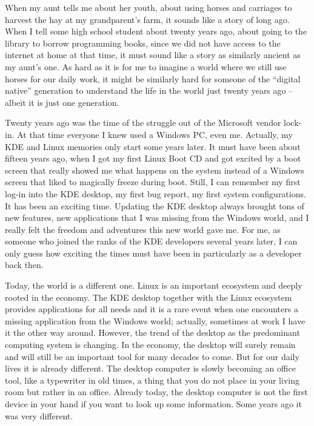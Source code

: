 
\noindent{}When my aunt tells me about her youth, about using horses and carriages to harvest the hay at my grandparent's farm, it sounds like a story of long ago. When I tell some high school student about twenty years ago, about going to the library to borrow programming books, since we did not have access to the internet at home at that time, it must sound like a story as similarly ancient as my aunt’s one. As hard as it is for me to imagine a world where we still use horses for our daily work, it might be similarly hard for someone of the ``digital native'' generation to understand the life in the world just twenty years ago – albeit it is just one generation.

Twenty years ago was the time of the struggle out of the Microsoft vendor lock-in. At that time everyone I knew used a Windows PC, even me. Actually, my KDE and Linux memories only start some years later. It must have been about fifteen years ago, when I got my first Linux Boot CD and got excited by a boot screen that really showed me what happens on the system instead of a Windows screen that liked to magically freeze during boot. Still, I can remember my first log-in into the KDE desktop, my first bug report, my first system configurations. It has been an exciting time. Updating the KDE desktop always brought tons of new features, new applications that I was missing from the Windows world, and I really felt the freedom and adventures this new world gave me. For me, as someone who joined the ranks of the KDE developers several years later, I can only guess how exciting the times must have been in particularly as a developer back then.

Today, the world is a different one. Linux is an important ecosystem and deeply rooted in the economy. The KDE desktop together with the Linux ecosystem provides applications for all needs and it is a rare event when one encounters a missing application from the Windows world; actually, sometimes at work I have it the other way around. However, the trend of the desktop as the predominant computing system is changing. In the economy, the desktop will surely remain and will still be an important tool for many decades to come. But for our daily lives it is already different. The desktop computer is slowly becoming an office tool, like a typewriter in old times, a thing that you do not place in your living room but rather in an office. Already today, the desktop computer is not the first device in your hand if you want to look up some information. Some years ago it was very different.

